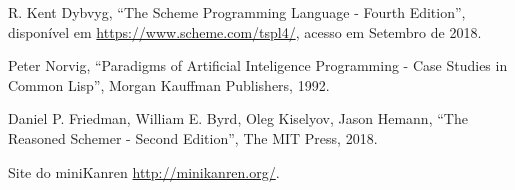 \documentclass{article}
\begin{document}
    
  \begin{thebibliography}{1}

   R. Kent Dybvyg,
    ``The Scheme Programming Language - Fourth Edition'',
    disponível em \url{https://www.scheme.com/tspl4/}, acesso em
    Setembro de 2018.

   Peter Norvig,
    ``Paradigms of Artificial Inteligence Programming - Case Studies
    in Common Lisp'',
    Morgan Kauffman Publishers, 1992.

     Daniel P. Friedman, William E. Byrd, Oleg Kiselyov,
      Jason Hemann,
      ``The Reasoned Schemer - Second Edition'',
      The MIT Press, 2018.

       Site do miniKanren \url{http://minikanren.org/}.
      
  \end{thebibliography}
\end{document}
